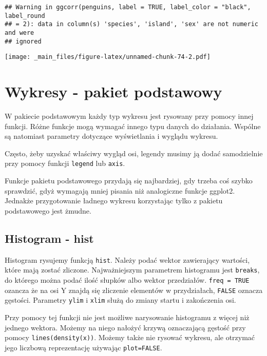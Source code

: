 \documentclass[
]{book}
\newenvironment{Shaded}{\begin{snugshade}}{\end{snugshade}}
\newcommand{\FunctionTok}[1]{\textcolor[rgb]{0.00,0.00,0.00}{#1}}
\newcommand{\NormalTok}[1]{#1}
\newcommand{\OtherTok}[1]{\textcolor[rgb]{0.56,0.35,0.01}{#1}}
\newcommand{\SpecialCharTok}[1]{\textcolor[rgb]{0.00,0.00,0.00}{#1}}
\begin{document}
\begin{verbatim}
## Warning in ggcorr(penguins, label = TRUE, label_color = "black", label_round
## = 2): data in column(s) 'species', 'island', 'sex' are not numeric and were
## ignored
\end{verbatim}

\texttt{[image: \_main\_files/figure-latex/unnamed-chunk-74-2.pdf]}

\hypertarget{wykresy---pakiet-podstawowy}{%
\chapter{Wykresy - pakiet podstawowy}\label{wykresy---pakiet-podstawowy}}

W pakiecie podstawowym każdy typ wykresu jest rysowany przy pomocy innej funkcji. Różne funkcje mogą wymagać innego typu danych do działania. Wspólne są natomiast parametry dotyczące wyświetlania i wyglądu wykresu.

Często, żeby uzyskać właściwy wygląd osi, legendy musimy ją dodać samodzielnie przy pomocy funkcji \texttt{legend} lub \texttt{axis}.

Funkcje pakietu podstawowego przydają się najbardziej, gdy trzeba coś szybko sprawdzić, gdyż wymagają mniej pisania niż analogiczne funkcje ggplot2. Jednakże przygotowanie ładnego wykresu korzystając tylko z pakietu podstawowego jest żmudne.

\hypertarget{histogram---hist}{%
\section{Histogram - hist}\label{histogram---hist}}

Histogram rysujemy funkcją \texttt{hist}. Należy podać wektor zawierający wartości, które mają zostać zliczone. Najważniejszym parametrem histogramu jest \texttt{breaks}, do którego można podać ilość słupków albo wektor przedziałów. \texttt{freq\ =\ TRUE} ozancza że na osi Y znajdą się zliczenie elementów w przydziałach, \texttt{FALSE} oznacza gęstości. Parametry \texttt{ylim} i \texttt{xlim} służą do zmiany startu i zakończenia osi.

Przy pomocy tej funkcji nie jest możliwe narysowanie histogramu z więcej niż jednego wektora. Możemy na niego nałożyć krzywą oznaczającą gęstość przy pomocy \texttt{lines(density(x))}. Możemy także nie rysować wykresu, ale otrzymać jego liczbową reprezentację używając \texttt{plot=FALSE}.

\begin{Shaded}
\end{Shaded}
\end{document}
